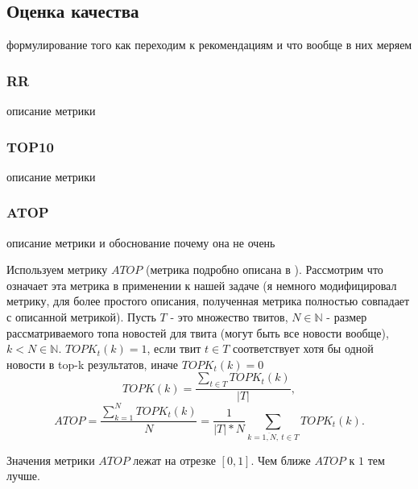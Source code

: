 \subsection{Оценка качества}
    формулирование того как переходим к рекомендациям и что вообще в них меряем

    \subsubsection{RR}
        описание метрики
    \subsubsection{TOP10}
        описание метрики
    \subsubsection{ATOP}
        описание метрики и обоснование почему она не очень

        Используем метрику $ATOP$ (метрика подробно описана в \cite{steck_recommender}).
        Рассмотрим что означает эта метрика в применении к нашей задаче (я немного модифицировал метрику, для более простого описания, полученная метрика полностью совпадает с описанной метрикой).
        Пусть $T$ - это множество твитов, $N \in \mathbb{N}$ - размер рассматриваемого топа новостей для твита (могут быть все новости вообще), $k < N \in \mathbb{N}$.
        $TOPK_t(k) = 1$, если твит $t \in T$ соответствует хотя бы одной новости в top-k результатов, иначе $TOPK_t(k) = 0$
        $$TOPK(k) = \dfrac {\sum_{t \in T} TOPK_t(k)} {|T|},$$
        $$ATOP = \dfrac{\sum_{k=1}^N TOPK_t(k)}{N} = \dfrac{1}{|T| * N} \sum_{k=\overline{1,N}, ~t \in T} TOPK_t(k).$$

        Значения метрики $ATOP$ лежат на отрезке $[0,1]$. Чем ближе $ATOP$ к $1$ тем лучше.